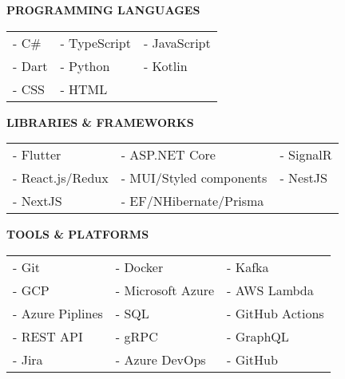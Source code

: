 \documentclass[10pt,a4paper,ragged2e]{altacv}
\begin{document}
\divider



\smallskip

\textcolor{VividPurple}{\textbf{PROGRAMMING LANGUAGES}}
\medskip

\begin{tabular}{ l l l }
	- C\#  & - TypeScript & - JavaScript \\
	- Dart & - Python     & - Kotlin     \\
	- CSS  & - HTML            			 \\
\end{tabular}

\smallskip
\divider

\textcolor{VividPurple}{\textbf{LIBRARIES \& FRAMEWORKS}}
\medskip

\begin{tabular}{ l l l } 
	- Flutter         & - ASP.NET Core 				& - SignalR \\
	- React.js/Redux  & - MUI/Styled components     & - NestJS  \\ 
    - NextJS          & - EF/NHibernate/Prisma					\\
\end{tabular}

\smallskip
\divider

\textcolor{VividPurple}{\textbf{TOOLS \& PLATFORMS}}
\medskip

\begin{tabular}{ l l l }
	- Git            & - Docker          & - Kafka          \\
	- GCP            & - Microsoft Azure & - AWS Lambda     \\
	- Azure Piplines & - SQL             & - GitHub Actions \\
	- REST API       & - gRPC            & - GraphQL        \\
	- Jira           & - Azure DevOps    & - GitHub         \\ 
\end{tabular}
\smallskip

\smallskip
\end{document}
